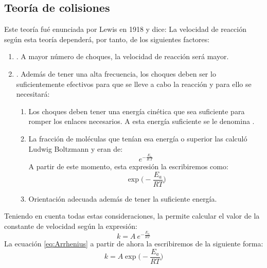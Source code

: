     \subsection{Teoría de colisiones}\label{subsec:teoria-de-colisiones}
    Este teoría fué enunciada por Lewis en 1918 y dice:
    La velocidad de reacción según esta teoría dependerá, por tanto, de los siguientes factores:
    \begin{enumerate}[label=\numberballmDarkTeal]
        \item {}.
        A mayor número de choques, la velocidad de reacción será mayor.
        \item {}.
        Además de tener una alta frecuencia, los choques deben ser lo suficientemente efectivos para que se lleve a cabo la reacción y para ello se necesitará:
        \begin{enumerate}
            \item Los choques deben tener una energía cinética que sea suficiente para romper los enlaces necesarios.
            A esta energía suficiente se le denomina .
            \item La fracción de moléculas que tenían esa energía o superior las calculó Ludwig Boltzmann y eran de:
            \begin{equation*}
                e^{-\frac{E_a}{R\ T}}
            \end{equation*}
            A partir de este momento, esta expresión la escribiremos como:
            \begin{equation}
                \exp\biggl(-\dfrac{E_a}{RT}\biggr)\label{eq:expresion_Boltzman}
            \end{equation}
            \item Orientación adecuada además de tener la suficiente energía.
        \end{enumerate}
    \end{enumerate}

    Teniendo en cuenta todas estas consideraciones, la  permite calcular el valor de la constante de velocidad según la expresión:
    \begin{equation}
        k = A\ e^{-\frac{E_a}{R T}}\label{eq:Arrhenius}
    \end{equation}
    La ecuación \eqref{eq:Arrhenius} a partir de ahora la escribiremos de la siguiente forma:
    \begin{equation}
        k = A\exp\biggl(-\dfrac{E_a}{RT}\biggr)\label{eq:Arrhenius_b}
    \end{equation}


